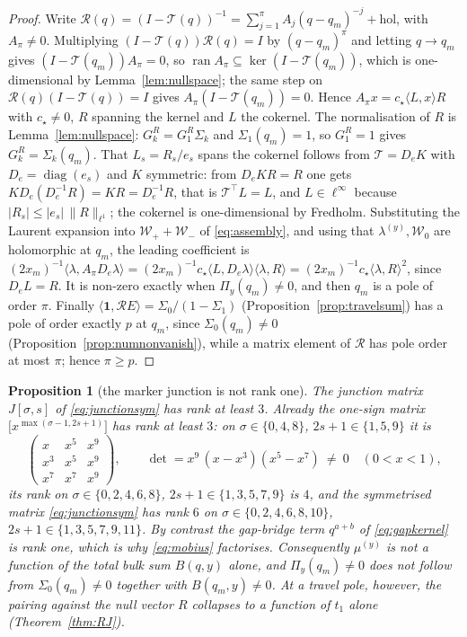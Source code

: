 \documentclass[11pt]{article}
\theoremstyle{plain}
\newtheorem{proposition}[theorem]{Proposition}
\theoremstyle{definition}
\theoremstyle{remark}
\begin{document}
\begin{proof}
Write $\mathcal R(q)=(I-\mathcal T(q))^{-1}=\sum_{j=1}^{\pi}A_j(q-q_m)^{-j}+\text{hol}$, with
$A_\pi\ne0$. Multiplying $(I-\mathcal T(q))\mathcal R(q)=I$ by $(q-q_m)^{\pi}$ and letting
$q\to q_m$ gives $(I-\mathcal T(q_m))A_{\pi}=0$, so
$\operatorname{ran}A_{\pi}\subseteq\ker(I-\mathcal T(q_m))$, which is one-dimensional by
Lemma~\ref{lem:nullspace}; the same step on $\mathcal R(q)(I-\mathcal T(q))=I$ gives
$A_{\pi}(I-\mathcal T(q_m))=0$. Hence $A_\pi x=c_\star\langle L,x\rangle R$ with $c_\star\ne0$,
$R$ spanning the kernel and $L$ the cokernel. The normalisation of $R$ is
Lemma~\ref{lem:nullspace}: $G^R_k=G^R_1\Sigma_k$ and $\Sigma_1(q_m)=1$, so $G^R_1=1$ gives
$G^R_k=\Sigma_k(q_m)$. That $L_s=R_s/e_s$ spans the cokernel follows from
$\mathcal T=D_eK$ with $D_e=\operatorname{diag}(e_s)$ and $K$ symmetric: from $D_eKR=R$ one gets
$KD_e(D_e^{-1}R)=KR=D_e^{-1}R$, that is $\mathcal T^{\!\top}L=L$, and $L\in\ell^\infty$ because
$|R_s|\le|e_s|\,\|R\|_{\ell^1}$; the cokernel is one-dimensional by Fredholm. Substituting the
Laurent expansion into $\mathcal W_++\mathcal W_-$ of \eqref{eq:assembly}, and using that
$\lambda^{(y)},\mathcal W_0$ are holomorphic at $q_m$, the leading coefficient is
$(2x_m)^{-1}\langle\lambda,A_\pi D_e\lambda\rangle=(2x_m)^{-1}c_\star\langle L,D_e\lambda\rangle
\langle\lambda,R\rangle=(2x_m)^{-1}c_\star\langle\lambda,R\rangle^2$, since $D_eL=R$. It is
non-zero exactly when $\Pi_y(q_m)\ne0$, and then $q_m$ is a pole of order $\pi$. Finally
$\langle\mathbf 1,\mathcal RE\rangle=\Sigma_0/(1-\Sigma_1)$ (Proposition~\ref{prop:travelsum}) has
a pole of order exactly $p$ at $q_m$, since $\Sigma_0(q_m)\ne0$
(Proposition~\ref{prop:numnonvanish}), while a matrix element of $\mathcal R$ has pole order at
most $\pi$; hence $\pi\ge p$.
\end{proof}

\begin{proposition}[the marker junction is not rank one]\label{prop:junction}
The junction matrix $J[\sigma,s]$ of \eqref{eq:junctionsym} has rank at least $3$. Already the
one-sign matrix $\bigl[x^{\max(\sigma-1,2s+1)}\bigr]$ has rank at least $3$: on
$\sigma\in\{0,4,8\}$, $2s+1\in\{1,5,9\}$ it is
\[
   \begin{pmatrix}x&x^5&x^9\\ x^3&x^5&x^9\\ x^7&x^7&x^9\end{pmatrix},\qquad
   \det=x^{9}\,(x-x^{3})(x^{5}-x^{7})\ \ne\ 0\quad(0<x<1),
\]
its rank on $\sigma\in\{0,2,4,6,8\}$, $2s+1\in\{1,3,5,7,9\}$ is $4$, and the symmetrised matrix
\eqref{eq:junctionsym} has rank $6$ on $\sigma\in\{0,2,4,6,8,10\}$, $2s+1\in\{1,3,5,7,9,11\}$. By
contrast the gap-bridge term $q^{a+b}$ of \eqref{eq:gapkernel} is rank one, which is why
\eqref{eq:mobius} factorises. Consequently $\mu^{(y)}$ is not a function of the total bulk sum
$B(q,y)$ alone, and $\Pi_y(q_m)\ne0$ does not follow from $\Sigma_0(q_m)\ne0$ together with
$B(q_m,y)\ne0$. At a travel pole, however, the pairing against the null vector $R$ collapses to a
function of $t_1$ alone (Theorem~\ref{thm:RJ}).
\end{proposition}
\end{document}
